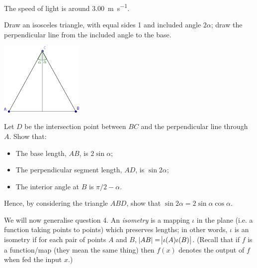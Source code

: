 \documentclass[answers]{exam}
\begin{document}
\begin{questions}
            The speed of light is around \SI{3.00}{\metre\per\second}.


  \question Draw an isosceles triangle, with equal sides 1 and included angle $ 2\alpha $; draw the perpendicular line from the included
            angle to the base.
            \begin{center}
              \includegraphics[width=0.3\textwidth]{exercises-2-1}
            \end{center}
            Let $ D $ be the intersection point between $ BC $ and the perpendicular line through $ A $. Show that:
            \begin{itemize}
              \item The base length, $ AB $, is $ 2\sin\alpha $;
              \item The perpendicular segment length, $ AD $, is $ \sin 2\alpha $;
              \item The interior angle at $ B $ is $ \pi/2 - \alpha $.
            \end{itemize}
            Hence, by considering the triangle $ ABD $, show that $ \sin 2\alpha = 2\sin \alpha \cos \alpha $.

  \question We will now generalise question 4. An \emph{isometry} is a mapping $ \iota $ in the plane (i.e. a function taking points
            to points) which preserves lengths; in other words, $ \iota $ is an isometry if for each pair of
            points $ A $ and $ B $, $ \abs{AB} = \abs{\iota(A)\iota(B)} $. (Recall that if $ f $ is a function/map (they mean the same
            thing) then $ f(x) $ denotes the output of $ f $ when fed the input $ x $.)
    \begin{parts}

\end{parts}
\end{questions}
\end{document}
